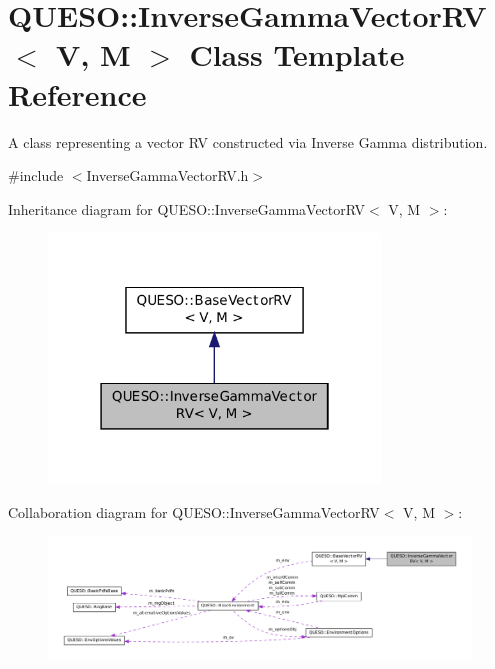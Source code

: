 \hypertarget{class_q_u_e_s_o_1_1_inverse_gamma_vector_r_v}{\section{Q\-U\-E\-S\-O\-:\-:Inverse\-Gamma\-Vector\-R\-V$<$ V, M $>$ Class Template Reference}
\label{class_q_u_e_s_o_1_1_inverse_gamma_vector_r_v}
}


A class representing a vector R\-V constructed via Inverse Gamma distribution.  




{\ttfamily \#include $<$Inverse\-Gamma\-Vector\-R\-V.\-h$>$}



Inheritance diagram for Q\-U\-E\-S\-O\-:\-:Inverse\-Gamma\-Vector\-R\-V$<$ V, M $>$\-:
\nopagebreak
\begin{figure}[H]
\begin{center}
\leavevmode
\includegraphics[width=250pt]{class_q_u_e_s_o_1_1_inverse_gamma_vector_r_v__inherit__graph}
\end{center}
\end{figure}


Collaboration diagram for Q\-U\-E\-S\-O\-:\-:Inverse\-Gamma\-Vector\-R\-V$<$ V, M $>$\-:
\nopagebreak
\begin{figure}[H]
\begin{center}
\leavevmode
\includegraphics[width=350pt]{class_q_u_e_s_o_1_1_inverse_gamma_vector_r_v__coll__graph}
\end{center}
\end{figure}
